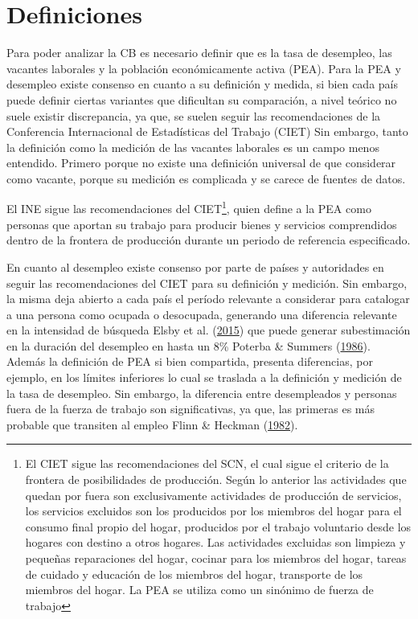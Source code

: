 \documentclass[12pt,oneside]{reedthesis}
\begin{document}
\hypertarget{definiciones}{%
\section{Definiciones}\label{definiciones}}

Para poder analizar la CB es necesario definir que es la tasa de desempleo, las vacantes laborales y la población económicamente activa (PEA). Para la PEA y desempleo existe consenso en cuanto a su definición y medida, si bien cada país puede definir ciertas variantes que dificultan su comparación, a nivel teórico no suele existir discrepancia, ya que, se suelen seguir las recomendaciones de la Conferencia Internacional de Estadísticas del Trabajo (CIET) Sin embargo, tanto la definición como la medición de las vacantes laborales es un campo menos entendido. Primero porque no existe una definición universal de que considerar como vacante, porque su medición es complicada y se carece de fuentes de datos.

El INE sigue las recomendaciones del CIET\footnote{El CIET sigue las recomendaciones del SCN, el cual sigue el criterio de la frontera de posibilidades de producción. Según lo anterior las actividades que quedan por fuera son exclusivamente actividades de producción de servicios, los servicios excluidos son los producidos por los miembros del hogar para el consumo final propio del hogar, producidos por el trabajo voluntario desde los hogares con destino a otros hogares. Las actividades excluidas son limpieza y pequeñas reparaciones del hogar, cocinar para los miembros del hogar, tareas de cuidado y educación de los miembros del hogar, transporte de los miembros del hogar. La PEA se utiliza como un sinónimo de fuerza de trabajo}, quien define a la PEA como
personas que aportan su trabajo para producir bienes y servicios comprendidos dentro de la frontera de producción durante un periodo de referencia especificado.

En cuanto al desempleo existe consenso por parte de países y autoridades en seguir las recomendaciones del CIET para su definición y medición. Sin embargo, la misma deja abierto a cada país el período relevante a considerar para catalogar a una persona como ocupada o desocupada, generando una diferencia relevante en la intensidad de búsqueda Elsby et al. (\protect\hyperlink{ref-Elsby2015}{2015}) que puede generar subestimación en la duración del desempleo en hasta un 8\% Poterba \& Summers (\protect\hyperlink{ref-Poterba1986}{1986}). Además la definición de PEA si bien compartida, presenta diferencias, por ejemplo, en los límites inferiores lo cual se traslada a la definición y medición de la tasa de desempleo. Sin embargo, la diferencia entre desempleados y personas fuera de la fuerza de trabajo son significativas, ya que, las primeras es más probable que transiten al empleo Flinn \& Heckman (\protect\hyperlink{ref-Flinn1982}{1982}).
\end{document}
